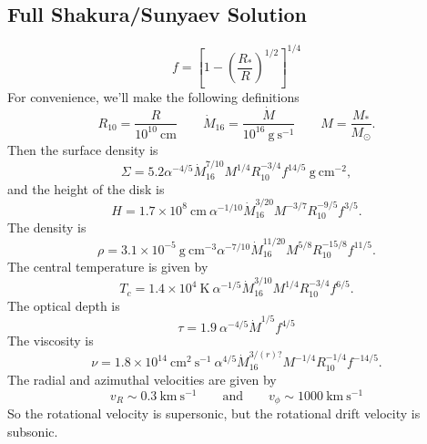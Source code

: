\documentclass[10pt]{article}
\numberwithin{equation}{section}
\begin{document}
\subsection{Full Shakura/Sunyaev Solution} %
\label{sub:full_shakura_sunyaev_solution_}

\begin{equation}
	\label{eq:full:1} f = \left[1-\left(\frac{R_*}{R}\right)^{1/2}\right]^{1/4}
\end{equation}
For convenience, we'll make the following definitions
\begin{equation}
	\label{eq:full:2} R_{10} = \frac{R}{10^{10}\ \mathrm{cm}} \qquad \dot{M}_{16} = \frac{\dot{M}}{10^{16}\ \mathrm{g\ s^{-1}}} \qquad M = \frac{M_*}{M_\odot}.
\end{equation}
Then the surface density is
\begin{equation}
	\label{eq:full:3} \Sigma = 5.2 \alpha^{-4/5} \dot{M}_{16}^{7/10}M^{1/4}R_{10}^{-3/4} f^{14/5}\ \mathrm{g\ cm^{-2}},
\end{equation}
and the height of the disk is
\begin{equation}
	\label{eq:full:4} H = 1.7\times 10^8\ \mathrm{cm}\ \alpha^{-1/10}\dot{M}_{16}^{3/20} M^{-3/7} R_{\mathrm{10}}^{-9/5}f^{3/5}.
\end{equation}
The density is
\begin{equation}
	\label{eq:full:5} \rho = 3.1\times 10^{-5}\ \mathrm{g\ cm^{-3}} \alpha^{-7/10} \dot{M}_{16}^{11/20} M^{5/8} R_{10}^{-15/8}f^{11/5}.
\end{equation}
The central temperature is given by
\begin{equation}
	\label{eq:full:6} T_c = 1.4\times 10^4\ \mathrm{K}\ \alpha^{-1/5} \dot{M}_{16}^{3/10} M^{1/4} R_{10}^{-3/4} f^{6/5}.
\end{equation}
The optical depth is
\begin{equation}
	\label{eq:full:7} \tau = 1.9\ \alpha^{-4/5} \dot{M}^{1/5} f^{4/5}
\end{equation}
The viscosity is
\begin{equation}
	\label{eq:full:8} \nu = 1.8\times 10^{14}\ \mathrm{cm^2\ s^{-1}}\ \alpha^{4/5} \dot{M}_{16}^{3/(r)?}M^{-1/4}R_{10}^{-1/4} f^{-14/5}.
\end{equation} 
The radial and azimuthal velocities are given by
\begin{equation}
	\label{eq:full:9} v_R \sim 0.3\ \mathrm{km\ s^{-1}} \qquad \mathrm{and}\qquad v_\phi\sim 1000\ \mathrm{km\ s^{-1}}
\end{equation}
So the rotational velocity is supersonic, but the rotational drift velocity is subsonic.
\end{document}
